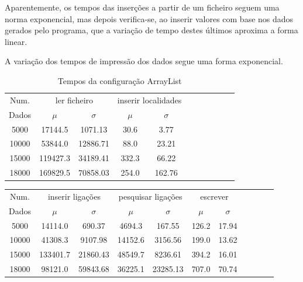 \documentclass[a5paper,twocolumn, 11pt]{article}
\begin{document}
Aparentemente, os tempos das inserções a partir de um ficheiro seguem uma norma exponencial, mas depois verifica-se, ao inserir valores com base nos dados gerados pelo programa, que a variação de tempo destes últimos aproxima a forma linear.

A variação dos tempos de impressão dos dados segue uma forma exponencial.
\clearpage
\onecolumn
\begin{center}
    \begin{table}[h!b!t!]
    \begin{center}
    \caption{Tempos da configuração ArrayList}
    \begin{tabular}[hbt]{ | *{11}{c|} }
    \hline
        Num. & \multicolumn{2}{|c|}{ler ficheiro} & \multicolumn{2}{|c|}{inserir localidades}\\ %
        Dados & $\mu$ & $\sigma$ & $\mu$ & $\sigma$\\ \hline
        5000 & 17144.5 & 1071.13 & 30.6 & 3.77\\ \hline
        10000 & 53844.0 & 12886.71 & 88.0 & 23.21\\ \hline
        15000 & 119427.3 & 34189.41 & 332.3 & 66.22\\ \hline
        18000 & 169829.5 & 70858.03 & 254.0 & 162.76\\ \hline
    \end{tabular}
\end{center}
\end{table}
    \begin{tabular}{ | *{11}{c|} }
    \hline
        Num.  & \multicolumn{2}{|c|}{inserir ligações} & \multicolumn{2}{|c|}{pesquisar ligações} & \multicolumn{2}{|c|}{escrever}\\ %
        Dados & $\mu$ & $\sigma$ & $\mu$ & $\sigma$ & $\mu$ & $\sigma$\\ \hline

        5000 & 14114.0 & 690.37 & 4694.3 & 167.55 & 126.2 & 17.94\\ \hline
        10000 & 41308.3 & 9107.98 & 14152.6 & 3156.56 & 199.0 & 13.62\\ \hline
        15000 & 133401.7 & 21860.43 & 48549.7 & 8236.61 & 394.2 & 16.01\\ \hline
        18000 & 98121.0 & 59843.68 & 36225.1 & 23285.13 & 707.0 & 70.74\\ \hline
    \end{tabular}
\end{center}
\end{document}
